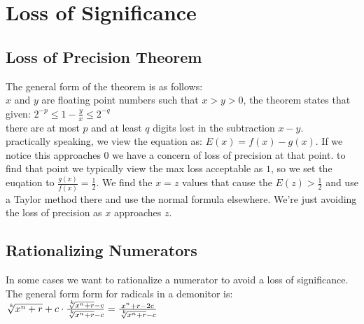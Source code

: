 \section{Loss of Significance}


\subsection*{Loss of Precision Theorem}
The general form of the theorem is as follows:\\
$x$ and $y$ are floating point numbers such that $x > y > 0$,
the theorem states that given:
$ 2^{-p} \leq 1 - \frac{y}{x} \leq 2^{-q} $\\
there are at most $p$ and at least $q$ digits lost in the subtraction $x-y$.\\

practically speaking, we view the equation as: $E(x) = f(x) - g(x)$. If
we notice this approaches $0$ we have a concern of loss of precision at that point.
to find that point we typically view the max loss acceptable as $1$, so we set
the euqation to $\frac{g(x)}{f(x)} = \frac{1}{2}$. We find the $x = z$ values that cause
the $E(z) > \frac{1}{2}$ and use a Taylor method there and use the normal formula elsewhere.
We're just avoiding the loss of precision as $x$ approaches $z$.

\subsection*{Rationalizing Numerators}
In some cases we want to rationalize a numerator to avoid a loss of significance.
The general form form for radicals in a demonitor is:\\
$\sqrt[\leftroot{-2}\uproot{2}k]{x^n + r} + c  \cdot \frac{\sqrt[\leftroot{-2}\uproot{2}k]{x^n + r} - c}{\sqrt[\leftroot{-2}\uproot{2}k]{x^n + r} - c}   =  \frac{x^n + r -2c}{\sqrt[\leftroot{-2}\uproot{2}k]{x^n + r} - c}$\\
